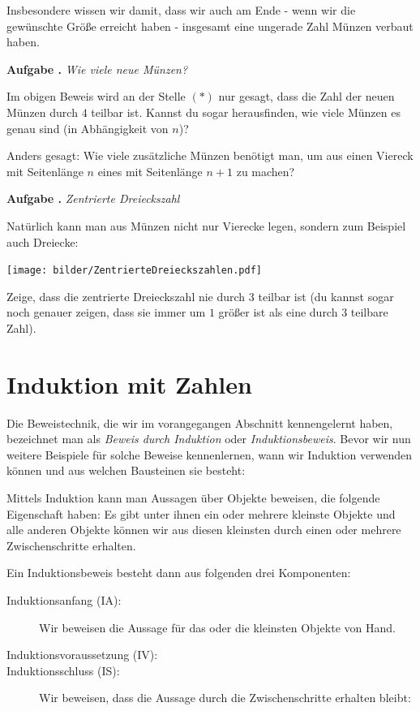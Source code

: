 \documentclass[a4paper,ngerman,12pt]{scrartcl}
\theoremstyle{definition}
\theoremstyle{plain}
\theoremstyle{remark}
\newlength{\aufgabenskip}
\newcounter{aufgabennummer}
\newenvironment{aufgabe}[1]{
	\addtocounter{aufgabennummer}{1}
	\textbf{Aufgabe \theaufgabennummer.} \emph{#1} \par
}{\vspace{\aufgabenskip}}
\begin{document}
Insbesondere wissen wir damit, dass wir auch am Ende - wenn wir die gewünschte Größe erreicht haben - insgesamt eine ungerade Zahl Münzen verbaut haben.

\begin{aufgabe}{Wie viele neue Münzen?}
	Im obigen Beweis wird an der Stelle $(\ast)$ nur gesagt, dass die Zahl der neuen Münzen durch $4$ teilbar ist. Kannst du sogar herausfinden, wie viele Münzen es genau sind (in Abhängigkeit von $n$)?
	
	Anders gesagt: Wie viele zusätzliche Münzen benötigt man, um aus einen Viereck mit Seitenlänge $n$ eines mit Seitenlänge $n+1$ zu machen?
\end{aufgabe}

\begin{aufgabe}{Zentrierte Dreieckszahl}
	Natürlich kann man aus Münzen nicht nur Vierecke legen, sondern zum Beispiel auch Dreiecke:
	\begin{center}
		\texttt{[image: bilder/ZentrierteDreieckszahlen.pdf]}
	\end{center}	
	Zeige, dass die zentrierte Dreieckszahl nie durch $3$ teilbar ist (du kannst sogar noch genauer zeigen, dass sie immer um $1$ größer ist als eine durch $3$ teilbare Zahl).
\end{aufgabe}


\section{Induktion mit Zahlen}

Die Beweistechnik, die wir im vorangegangen Abschnitt kennengelernt haben, bezeichnet man als \emph{Beweis durch Induktion} oder \emph{Induktionsbeweis}. Bevor wir nun weitere Beispiele für solche Beweise kennenlernen, wann wir Induktion verwenden können und aus welchen Bausteinen sie besteht:

Mittels Induktion kann man Aussagen über \glqq Objekte\grqq{} beweisen, die folgende Eigenschaft haben: Es gibt unter ihnen ein oder mehrere \glqq kleinste\grqq{} Objekte und alle anderen Objekte können wir aus diesen kleinsten durch einen oder mehrere Zwischenschritte erhalten.

Ein Induktionsbeweis besteht dann aus folgenden drei Komponenten:

\begin{description}
	\item[Induktionsanfang (IA):] Wir beweisen die Aussage für das oder die kleinsten Objekte von Hand.
	\item[Induktionsvoraussetzung (IV):] 
	\item[Induktionsschluss (IS):] Wir beweisen, dass die Aussage durch die Zwischenschritte erhalten bleibt: 
\end{description}
\end{document}
